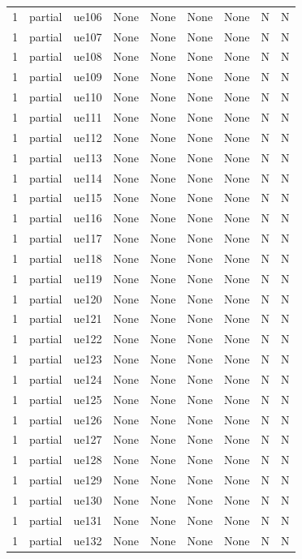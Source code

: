 \begin{table}[ht]
\begin{tabular}{|c|c|c|c|c|c|c|c|c|}
1 & partial & ue106 & None & None & None & None & N & N \\
1 & partial & ue107 & None & None & None & None & N & N \\
1 & partial & ue108 & None & None & None & None & N & N \\
1 & partial & ue109 & None & None & None & None & N & N \\
1 & partial & ue110 & None & None & None & None & N & N \\
1 & partial & ue111 & None & None & None & None & N & N \\
1 & partial & ue112 & None & None & None & None & N & N \\
1 & partial & ue113 & None & None & None & None & N & N \\
1 & partial & ue114 & None & None & None & None & N & N \\
1 & partial & ue115 & None & None & None & None & N & N \\
1 & partial & ue116 & None & None & None & None & N & N \\
1 & partial & ue117 & None & None & None & None & N & N \\
1 & partial & ue118 & None & None & None & None & N & N \\
1 & partial & ue119 & None & None & None & None & N & N \\
1 & partial & ue120 & None & None & None & None & N & N \\
1 & partial & ue121 & None & None & None & None & N & N \\
1 & partial & ue122 & None & None & None & None & N & N \\
1 & partial & ue123 & None & None & None & None & N & N \\
1 & partial & ue124 & None & None & None & None & N & N \\
1 & partial & ue125 & None & None & None & None & N & N \\
1 & partial & ue126 & None & None & None & None & N & N \\
1 & partial & ue127 & None & None & None & None & N & N \\
1 & partial & ue128 & None & None & None & None & N & N \\
1 & partial & ue129 & None & None & None & None & N & N \\
1 & partial & ue130 & None & None & None & None & N & N \\
1 & partial & ue131 & None & None & None & None & N & N \\
1 & partial & ue132 & None & None & None & None & N & N \\

\end{tabular}
\end{table}
